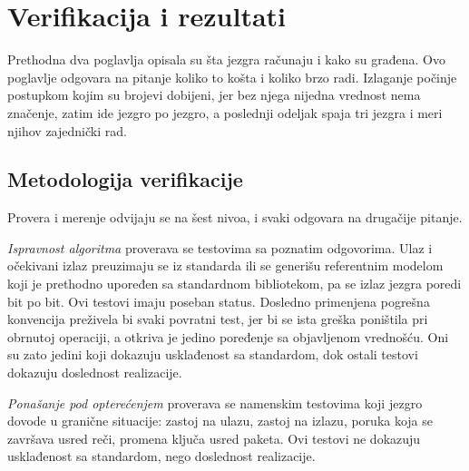 \chapter{Verifikacija i rezultati}
\label{ch:rezultati}

Prethodna dva poglavlja opisala su šta jezgra računaju i kako su građena. Ovo poglavlje odgovara na pitanje koliko to košta i koliko brzo radi. Izlaganje počinje postupkom kojim su brojevi dobijeni, jer bez njega nijedna vrednost nema značenje, zatim ide jezgro po jezgro, a poslednji odeljak spaja tri jezgra i meri njihov zajednički rad.

\section{Metodologija verifikacije}
\label{sec:rez_metodologija}

Provera i merenje odvijaju se na šest nivoa, i svaki odgovara na drugačije pitanje.

\textit{Ispravnost algoritma} proverava se testovima sa poznatim odgovorima. Ulaz i očekivani izlaz preuzimaju se iz standarda ili se generišu referentnim modelom koji je prethodno upoređen sa standardnom bibliotekom, pa se izlaz jezgra poredi bit po bit. Ovi testovi imaju poseban status. Dosledno primenjena pogrešna konvencija preživela bi svaki povratni test, jer bi se ista greška poništila pri obrnutoj operaciji, a otkriva je jedino poređenje sa objavljenom vrednošću. Oni su zato jedini koji dokazuju usklađenost sa standardom, dok ostali testovi dokazuju doslednost realizacije.

\textit{Ponašanje pod opterećenjem} proverava se namenskim testovima koji jezgro dovode u granične situacije: zastoj na ulazu, zastoj na izlazu, poruka koja se završava usred reči, promena ključa usred paketa. Ovi testovi ne dokazuju usklađenost sa standardom, nego doslednost realizacije.

